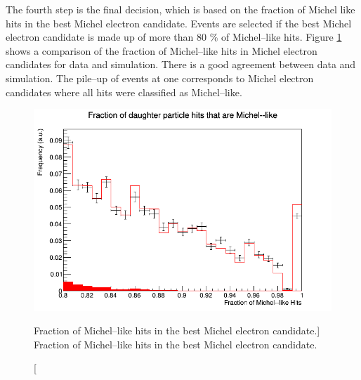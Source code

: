 The fourth step is the final decision, which is based on the fraction of Michel
like hits in the best Michel electron candidate. Events are selected if the 
best Michel electron candidate is made up of more than 80 \% of Michel--like 
hits. Figure \ref{fig:michel_like_frac} shows a comparison of the fraction of 
Michel--like hits in Michel electron candidates for \protodune{} data and 
simulation. There is a good agreement between data and simulation. The pile--up
of events at one corresponds to Michel electron candidates where all hits were 
classified as Michel--like.
\begin{figure}
	\centering
	\includegraphics[width=\textwidth]{figures/michel_like_frac.png}
	\caption
	[Fraction of Michel--like hits in the best Michel electron candidate.]
	{Fraction of Michel--like hits in the best Michel electron candidate.}
	\label{fig:michel_like_frac}
\end{figure}

